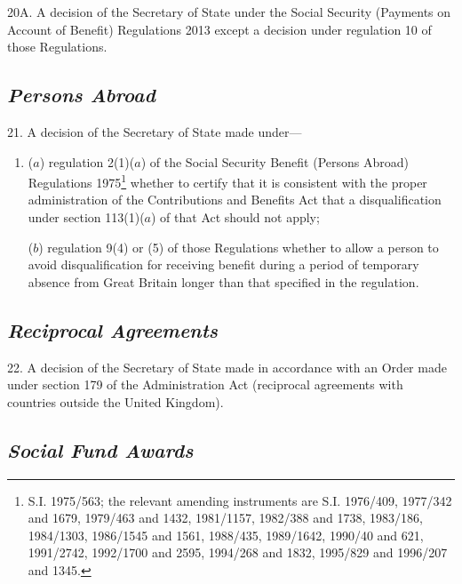 \documentclass[12pt,a4paper]{article}
\begin{document}

\medskip

20A.  A decision of the Secretary of State under the Social Security (Payments on Account of Benefit) Regulations 2013 except a decision under regulation 10 of those Regulations.


\subsection*{\itshape Persons Abroad}

21.  A decision of the Secretary of State made under—
\begin{enumerate}\item[]
($a$) regulation 2(1)($a$) of the Social Security Benefit (Persons Abroad) Regulations 1975\footnote{\frenchspacing S.I. 1975/563; the relevant amending instruments are S.I. 1976/409, 1977/342 and 1679, 1979/463 and 1432, 1981/1157, 1982/388 and 1738, 1983/186, 1984/1303, 1986/1545 and 1561, 1988/435, 1989/1642, 1990/40 and 621, 1991/2742, 1992/1700 and 2595, 1994/268 and 1832, 1995/829 and 1996/207 and 1345.} whether to certify that it is consistent with the proper administration of the Contributions and Benefits Act that a disqualification under section 113(1)($a$) of that Act should not apply;

($b$) regulation 9(4) or (5) of those Regulations whether to allow a person to avoid disqualification for receiving benefit during a period of temporary absence from Great Britain longer than that specified in the regulation.
\end{enumerate}

\subsection*{\itshape Reciprocal Agreements}

22.  A decision of the Secretary of State made in accordance with an Order made under section 179 of the Administration Act (reciprocal agreements with countries outside the United Kingdom).

\subsection*{\itshape Social Fund Awards}
\end{document}
